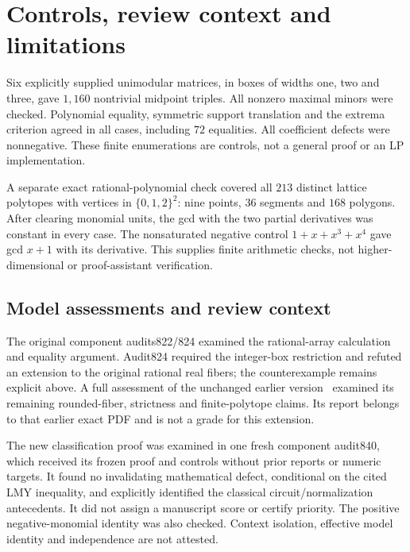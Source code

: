 \documentclass[11pt]{article}
\begin{document}
\section{Controls, review context and limitations}
Six explicitly supplied unimodular matrices, in boxes of widths one, two and three, gave \(1{,}160\) nontrivial midpoint triples. All nonzero maximal minors were checked. Polynomial equality, symmetric support translation and the extrema criterion agreed in all cases, including \(72\) equalities. All coefficient defects were nonnegative. These finite enumerations are controls, not a general proof or an LP implementation.

A separate exact rational-polynomial check covered all \(213\) distinct lattice polytopes with vertices in \(\{0,1,2\}^2\): nine points, \(36\) segments and \(168\) polygons. After clearing monomial units, the gcd with the two partial derivatives was constant in every case. The nonsaturated negative control \(1+x+x^3+x^4\) gave gcd \(x+1\) with its derivative. This supplies finite arithmetic checks, not higher-dimensional or proof-assistant verification.

\subsection*{Model assessments and review context}
The original component audits822/824 examined the rational-array calculation and equality argument. Audit824 required the integer-box restriction and refuted an extension to the original rational real fibers; the counterexample remains explicit above. A full assessment of the unchanged earlier version~\cite{V1} examined its remaining rounded-fiber, strictness and finite-polytope claims. Its report belongs to that earlier exact PDF and is not a grade for this extension.

The new classification proof was examined in one fresh component audit840, which received its frozen proof and controls without prior reports or numeric targets. It found no invalidating mathematical defect, conditional on the cited LMY inequality, and explicitly identified the classical circuit/normalization antecedents. It did not assign a manuscript score or certify priority. The positive negative-monomial identity was also checked. Context isolation, effective model identity and independence are not attested.
\end{document}
